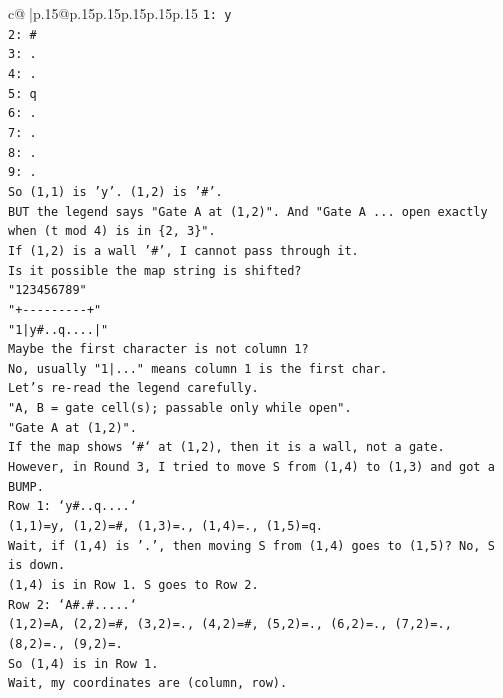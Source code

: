 \documentclass{article}
\begin{document}
{\begin{supertabular}{c@{$\;$}|p{.15\linewidth}@{}p{.15\linewidth}p{.15\linewidth}p{.15\linewidth}p{.15\linewidth}p{.15\linewidth}}
{{{\texttt{1: y} \\
\texttt{2: \#} \\
\texttt{3: .} \\
\texttt{4: .} \\
\texttt{5: q} \\
\texttt{6: .} \\
\texttt{7: .} \\
\texttt{8: .} \\
\texttt{9: .} \\
\texttt{So (1,1) is 'y'. (1,2) is '\#'.} \\
\texttt{BUT the legend says "Gate A at (1,2)". And "Gate A ... open exactly when (t mod 4) is in \{2, 3\}".} \\
\texttt{If (1,2) is a wall '\#', I cannot pass through it.} \\
\texttt{Is it possible the map string is shifted?} \\
\texttt{"123456789"} \\
\texttt{"+{-}{-}{-}{-}{-}{-}{-}{-}{-}+"} \\
\texttt{"1|y\#..q....|"} \\
\texttt{Maybe the first character is not column 1?} \\
\texttt{No, usually "1|..." means column 1 is the first char.} \\
\texttt{Let's re{-}read the legend carefully.} \\
\texttt{"A, B = gate cell(s); passable only while open".} \\
\texttt{"Gate A at (1,2)".} \\
\texttt{If the map shows `\#` at (1,2), then it is a wall, not a gate.} \\
\texttt{However, in Round 3, I tried to move S from (1,4) to (1,3) and got a BUMP.} \\
\texttt{Row 1: `y\#..q....`} \\
\texttt{(1,1)=y, (1,2)=\#, (1,3)=., (1,4)=., (1,5)=q.} \\
\texttt{Wait, if (1,4) is '.', then moving S from (1,4) goes to (1,5)? No, S is down.} \\
\texttt{(1,4) is in Row 1. S goes to Row 2.} \\
\texttt{Row 2: `A\#.\#.....`} \\
\texttt{(1,2)=A, (2,2)=\#, (3,2)=., (4,2)=\#, (5,2)=., (6,2)=., (7,2)=., (8,2)=., (9,2)=.} \\
\texttt{So (1,4) is in Row 1.} \\
\texttt{Wait, my coordinates are (column, row).} \\
}}}
\end{supertabular}}
\end{document}

